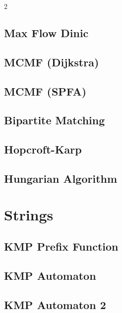 \documentclass[10pt,a4paper]{extarticle}
\begin{document}
\begin{landscape}
\begin{multicols}{2}
\subsection{Max Flow Dinic}


\subsection{MCMF (Dijkstra)}


\subsection{MCMF (SPFA)}


\subsection{Bipartite Matching}


\subsection{Hopcroft-Karp}


\subsection{Hungarian Algorithm}


\section{Strings}

\subsection{KMP Prefix Function}


\subsection{KMP Automaton}


\subsection{KMP Automaton 2}



\end{multicols}
\end{landscape}
\end{document}
